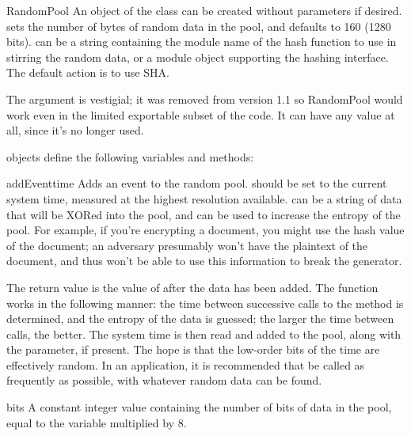 \documentclass{howto}
\begin{document}
\begin{funcdesc}{RandomPool}{ }
An object of the  class can be created without
parameters if desired.   sets the number of bytes of
random data in the pool, and defaults to 160 (1280 bits). 
can be a string containing the module name of the hash function to use
in stirring the random data, or a module object supporting the hashing
interface.  The default action is to use SHA.

The  argument is vestigial; it was removed from version
1.1 so RandomPool would work even in the limited exportable subset of
the code.  It can have any value at all, since it's no longer used.

\end{funcdesc}

 objects define the following variables and methods:

\begin{funcdesc}{addEvent}{time}
Adds an event to the random pool.   should be set to the
current system time, measured at the highest resolution available.
 can be a string of data that will be XORed into the pool,
and can be used to increase the entropy of the pool.  For example, if
you're encrypting a document, you might use the hash value of the
document; an adversary presumably won't have the plaintext of the
document, and thus won't be able to use this information to break the
generator.
\end{funcdesc}

The return value is the value of  after the data has
been added.  The function works in the following manner: the time
between successive calls to the  method is determined,
and the entropy of the data is guessed; the larger the time between
calls, the better.  The system time is then read and added to the pool,
along with the  parameter, if present.  The hope is that the
low-order bits of the time are effectively random.  In an application,
it is recommended that  be called as frequently as
possible, with whatever random data can be found.

\begin{datadesc}{bits}
A constant integer value containing the number of bits of data in
the pool, equal to the  variable multiplied by 8.
\end{datadesc}
\end{document}
